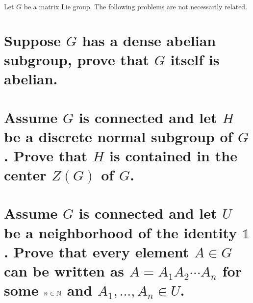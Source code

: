 \documentclass[
	pages,
	boxes,
	color=WildStrawberry
]{homework}
\begin{document}
\begin{problem}
Let $G$ be a matrix Lie group. The following problems are not necessarily related.
\begin{parts}
	\part{Suppose $G$ has a dense abelian subgroup, prove that $G$ itself is abelian.}\label{part:3a}
	\part{Assume $G$ is connected and let $H$ be a discrete normal subgroup of $G$. Prove that $H$ is contained in the center $Z(G)$ of $G$.}\label{part:3b}
	\part{Assume $G$ is connected and let $U$ be a neighborhood of the identity $\mathbb{1}$. Prove that every element $A\in G$ can be written as $A = A_1A_2\cdots A_n$ for some $n\in\mathbb{N}$ and $A_1,\ldots,A_n\in U$.}\label{part:3c}
\end{parts}
\end{problem}
\end{document}
